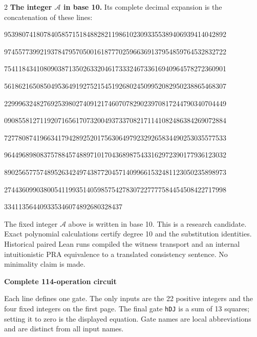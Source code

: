 \documentclass[10pt]{article}
\begin{document}
\begin{multicols}{2}
\textbf{The integer $\mathcal A$ in base 10.}
Its complete decimal expansion is the concatenation of these lines:\par
\begingroup\fontsize{7.7}{8.2}\selectfont{}\par
95398074180784058571518488282119861023093355389406939414042892\par
97455773992193784795705001618777025966369137954859764532832722\par
75411843410809038713502633204617333246733616940964578272360901\par
56186216508504953649192752154519268024509952082950238865468307\par
22999632482769253980274091217460707829023970817244790340704449\par
09085581271192071656170732004937337082171141082486384269072884\par
72778087419663417942892520175630649792329265834490253035577533\par
96449689808375788457488971017043689875433162972390177936123032\par
89025657757489526342497438772045714099661532481123050235898973\par
27443609903800541199351405985754278307227777584454508422717998\par
334113564409335346074892680328437\par
\endgroup
\normalfont\fontsize{7.7}{8.2}\selectfont
The fixed integer $\mathcal A$ above is written in base 10. This is a research
candidate. Exact polynomial calculations certify degree 10 and the
substitution identities. Historical paired Lean runs compiled the witness
transport and an internal intuitionistic PRA equivalence to a translated
consistency sentence. No
minimality claim is made.
\end{multicols}
\clearpage
\begin{center}{\large\bfseries Complete 114-operation circuit}\end{center}
Each line defines one gate. The only inputs are the 22 positive integers and
the four fixed integers on the first page. The final gate \texttt{hDJ} is a
sum of 13 squares; setting it to zero is the displayed equation. Gate names
are local abbreviations and are distinct from all input names.
\end{document}
